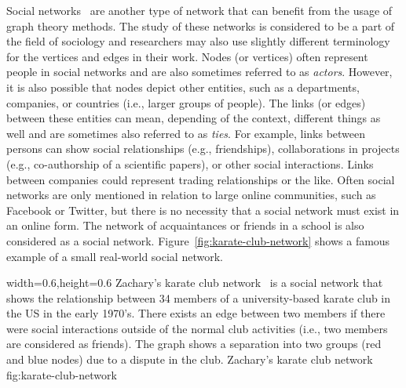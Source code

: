 Social networks~\cite{Newman2010} are another type of network that can benefit from the usage of graph theory methods.
The study of these networks is considered to be a part of the field of sociology and researchers may also use slightly different terminology for the vertices and edges in their work.
Nodes (or vertices) often represent people in social networks and are also sometimes referred to as \emph{actors}.
However, it is also possible that nodes depict other entities, such as a departments, companies, or countries (i.e., larger groups of people).
The links (or edges) between these entities can mean, depending of the context, different things as well and are sometimes also referred to as \emph{ties}.
For example, links between persons can show social relationships (e.g., friendships), collaborations in projects (e.g., co-authorship of a scientific papers), or other social interactions.
Links between companies could represent trading relationships or the like.
Often social networks are only mentioned in relation to large online communities, such as Facebook or Twitter, but there is no necessity that a social network must exist in an online form.
The network of acquaintances or friends in a school is also considered as a social network.
Figure~\ref{fig:karate-club-network} shows a famous example of a small real-world social network.

      {width=0.6\textwidth,height=0.6\textheight}
      {Zachary's karate club network~\cite{Zachary1977} is a social network that shows the relationship between 34 members of a university-based karate club in the US in the early 1970's.
      There exists an edge between two members if there were social interactions outside of the normal club activities (i.e., two members are considered as friends).
      The graph shows a separation into two groups (red and blue nodes) due to a dispute in the club.}
      {Zachary's karate club network}
      {fig:karate-club-network}

